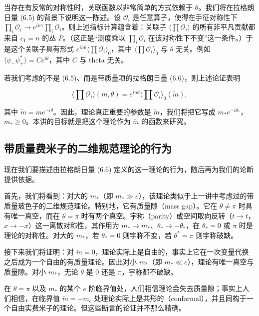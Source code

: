 当存在有反常的对称性时，关联函数以非常简单的方式依赖于 $\theta$。我们将在拉格朗日量 (6.5) 的背景下说明这一陈述。设 $\mathcal{O}_i$ 是任意算子，使得在手征对称性下 $\prod_i\mathcal{O}_i\to e^{in\gamma}\prod_i\mathcal{O}_i$。则上述指标计算蕴含着：关联子 $\langle\prod\mathcal{O}_i\rangle$ 的所有非平凡贡献都来自 $c_1=n$ 的丛 $P$。（这正是“测度乘以 $\prod_i\mathcal{O}_i$ 在该对称性下不变”这一条件。）于是这个关联子具有形式 $e^{in\theta}\langle\prod\mathcal{O}_i\rangle_0$，其中 $\langle\prod\mathcal{O}_i\rangle_0$ 与 $\theta$ 无关。例如 $\langle\psi_-\psi_+^*\rangle=Ce^{i\theta}$，其中 $C$ 与 theta 无关。

若我们考虑的不是 (6.5)、而是带质量项的拉格朗日量 (6.6)，则上述论证表明

\begin{equation}
  \tag{6.9}
  \label{eq:6-9}
  \Big\langle\prod\mathcal{O}_i\Big\rangle(m,\theta)=e^{in\theta}\Big\langle\prod\mathcal{O}_i\Big\rangle_0(\tilde m),
\end{equation}

其中 $\tilde m=me^{-i\theta}$。因此，理论真正重要的参数是 $\tilde m$，我们将把它写成 $m_*e^{-i\theta_*}$，$m_*\ge0$。本讲的目标就是把这个理论作为 $\tilde m$ 的函数来研究。

\subsection{带质量费米子的二维规范理论的行为}

现在我们要描述由拉格朗日量 (6.6) 定义的这一理论的行为，随后再为我们的论断提供依据。

首先，我们将看到：对大的 $m_*$（即 $m_*\gg e$），该理论类似于上一讲中考虑过的带质量玻色子的二维规范理论。特别地，它有质量隙（mass gap）。它在 $\theta\ne\pi$ 时具有唯一真空，而在 $\theta=\pi$ 时有两个真空。宇称（parity）或空间取向反转（$t\to t$，$x\to-x$）这一离散对称性，其作用为 $m_*\to m_*$、$\theta_*\to-\theta_*$，在 $\theta_*=0$ 或 $\pi$ 时是理论的对称性。对大的 $m_*$，若 $\theta_*=0$ 则宇称不变，若 $\theta^*=\pi$ 则宇称破缺。

接下来我们将证明：对 $\tilde m=0$，理论实际上是自由的，事实上它在一次变量代换之后成为一个自由的有质量理论。因此对小 $m_*$（即 $m_*\ll e$），理论有唯一真空与质量隙。对小 $m_*$，无论 $\theta$ 是 $0$ 还是 $\pi$，宇称都不破缺。

在 $\theta=\pi$ 以及 $m_*$ 的某个 $e$ 阶临界值处，人们相信理论会失去质量隙；事实上人们相信，在临界值 $\tilde m=-m_c$ 处理论实际上是共形的（conformal），并且同构于一个自由实费米子的理论。但这些断言的论证并不那么精确。

